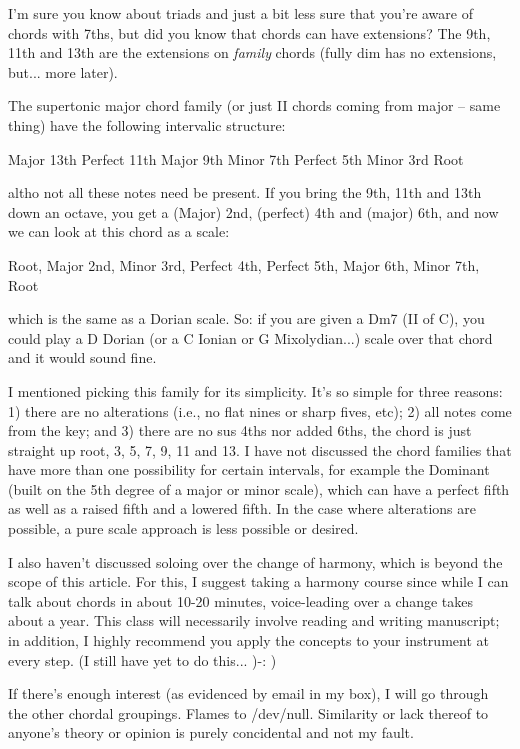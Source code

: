 I'm sure you know about triads and just a bit less sure that you're aware of
chords with 7ths, but did you know that chords can have extensions? The 9th,
11th and 13th are the extensions on \emph{family} chords (fully dim has no
extensions, but... more later).

The supertonic major chord family (or just II chords coming from major -- same
thing) have the following intervalic structure:

        Major 13th
        Perfect 11th
        Major 9th
        Minor 7th
        Perfect 5th
        Minor 3rd
        Root

altho not all these notes need be present. If you bring the 9th, 11th and 13th
down an octave, you get a (Major) 2nd, (perfect) 4th and (major) 6th, and now
we can look at this chord as a scale:

Root, Major 2nd, Minor 3rd, Perfect 4th, Perfect 5th, Major 6th, Minor 7th, Root

which is the same as a Dorian scale. So: if you are given a Dm7 (II of C),
you could play a D Dorian (or a C Ionian or G Mixolydian...) scale over that
chord and it would sound fine.

I mentioned picking this family for its simplicity. It's so simple for three
reasons: 1) there are no alterations (i.e., no flat nines or sharp fives, etc);
2) all notes come from the key; and 3) there are no sus 4ths nor added 6ths,
the chord is just straight up root, 3, 5, 7, 9, 11 and 13. I have not discussed
the chord families that have more than one possibility for certain intervals,
for example the Dominant (built on the 5th degree of a major or minor scale),
which can have a perfect fifth as well as a raised fifth and a lowered fifth.
In the case where alterations are possible, a pure scale approach is less
possible or desired.

I also haven't discussed soloing over the change of harmony, which is beyond
the scope of this article. For this, I suggest taking a harmony course since
while I can talk about chords in about 10-20 minutes, voice-leading over a
change takes about a year. This class will necessarily involve reading and
writing manuscript; in addition, I highly recommend you apply the concepts
to your instrument at every step. (I still have yet to do this... )-: )

If there's enough interest (as evidenced by email in my box), I will go through
the other chordal groupings. Flames to /dev/null. Similarity or lack thereof
to anyone's theory or opinion is purely concidental and not my fault.

